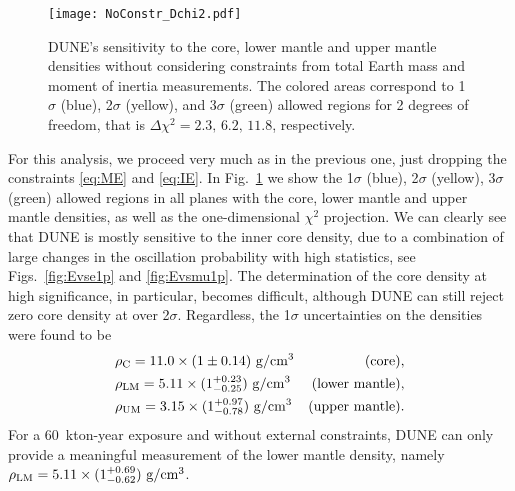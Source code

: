 \begin{figure}
\begin{center}
\texttt{[image: NoConstr\_Dchi2.pdf]}
\caption{DUNE's sensitivity to the core, lower mantle and upper mantle densities without considering constraints from total Earth mass and moment of inertia measurements. The colored areas correspond to 1$\sigma$ (blue), 2$\sigma$ (yellow), and 3$\sigma$ (green) allowed regions for 2 degrees of freedom, that is $\Delta \chi^2=2.3,\,6.2,\,11.8$, respectively. \label{fig:three_layers_no_constraints}}
\end{center}
\end{figure}
For this analysis, we proceed very much as in the previous one, just dropping the constraints \eqref{eq:ME} and \eqref{eq:IE}.
In Fig.~\ref{fig:three_layers_no_constraints} we show the 1$\sigma$ (blue), 2$\sigma$ (yellow), 3$\sigma$ (green) allowed regions in all planes with the core, lower mantle and upper mantle densities, as well as the one-dimensional $\chi^2$ projection.
We can clearly see that DUNE is mostly sensitive to the inner core density, due to a combination of large changes in the oscillation probability with high statistics, see Figs.~\ref{fig:Evse1p} and \ref{fig:Evsmu1p}.
The determination of the core density at high significance, in particular, becomes difficult, although DUNE can still reject zero core density at over 2$\sigma$.
Regardless, the 1$\sigma$ uncertainties on the densities were found to be 
\begin{subequations}
\begin{align}
  &\rho_{\rm C} = 11.0 \times(1\pm 0.14)~{\rm g}/{\rm cm}^3         &\text{(core)},&\\
  &\rho_{\rm LM} = 5.11\times(1^{+0.23}_{-0.25})~{\rm g}/{\rm cm}^3        &\text{(lower mantle)},&\\
  &\rho_{\rm UM} = 3.15 \times(1^{+0.97}_{-0.78})~{\rm g}/{\rm cm}^3      &\text{(upper mantle)}.&
\end{align}
\end{subequations}
For a 60~kton-year exposure and without external constraints, DUNE can only provide a meaningful measurement of the  lower mantle density, namely  $\rho_{\rm LM} = 5.11\times(1^{+0.69}_{-0.62})~{\rm g}/{\rm cm}^3$.

